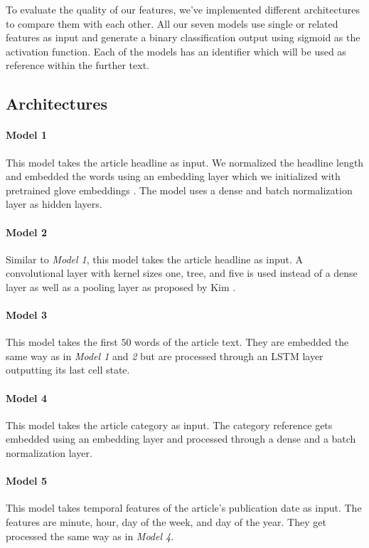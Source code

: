 To evaluate the quality of our features, we've implemented different architectures to compare them with each other.
All our seven models use single or related features as input and generate a binary classification output using sigmoid as the activation function. Each of the models has an identifier which will be used as reference within the further text.

\subsection{Architectures}

\paragraph{Model 1} 
This model takes the article headline as input.
We normalized the headline length and embedded the words using an embedding layer which we initialized with pretrained glove embeddings \cite{pennington2014glove}.
The model uses a dense and batch normalization layer as hidden layers.

\paragraph{Model 2} 
Similar to \textit{Model 1}, this model takes the article headline as input. 
A convolutional layer with kernel sizes one, tree, and five is used instead of a dense layer as well as a pooling layer as proposed by Kim \cite{kim2014convolutional}.

\paragraph{Model 3} 
This model takes the first $50$ words of the article text.
They are embedded the same way as in \textit{Model 1} and \textit{2} but are processed through an LSTM layer outputting its last cell state.

\paragraph{Model 4} 
This model takes the article category as input.
The category reference gets embedded using an embedding layer and processed through a dense and a batch normalization layer.

\paragraph{Model 5} 
This model takes temporal features of the article's publication date as input.
The features are minute, hour, day of the week, and day of the year.
They get processed the same way as in \textit{Model 4}.

